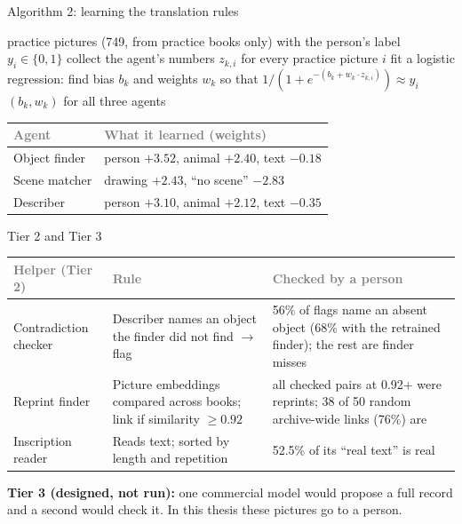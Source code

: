 \documentclass[aspectratio=169,11pt]{beamer}
\newcommand{\h}[1]{\textcolor{grey}{#1}}
\newcommand{\remark}[1]{\par\vspace{0.35cm}{\small\textcolor{grey}{#1}}}
\begin{document}
\begin{frame}{Algorithm 2: learning the translation rules}
\small
\begin{algorithmic}[1]
\Require practice pictures (749, from practice books only) with the person's label $y_i \in \{0, 1\}$
  \State collect the agent's numbers $z_{k,i}$ for every practice picture $i$
  \State fit a logistic regression: find bias $b_k$ and weights $w_k$ so that $1/(1+e^{-(b_k + w_k \cdot z_{k,i})}) \approx y_i$
\EndFor
\State \Return $(b_k, w_k)$ for all three agents
\end{algorithmic}
\vspace{0.4cm}
\begin{tabular}{@{}L{4.4cm} L{8.2cm}@{}}
\toprule
\h{Agent} & \h{What it learned (weights)}\\
\midrule
Object finder & person $+3.52$, animal $+2.40$, text $-0.18$\\
Scene matcher & drawing $+2.43$, ``no scene'' $-2.83$\\
Describer & person $+3.10$, animal $+2.12$, text $-0.35$\\
\bottomrule
\end{tabular}
\remark{Plus sign = pushes towards ``scene''. Nobody told it that a person is evidence of a scene; it learned it from the examples.}
\end{frame}

\begin{frame}{Tier 2 and Tier 3}
\small\begin{tabular}{@{}L{3.4cm} L{5.2cm} L{4.2cm}@{}}
\toprule
\h{Helper (Tier 2)} & \h{Rule} & \h{Checked by a person}\\
\midrule
Contradiction checker & Describer names an object the finder did not find $\to$ flag & 56\% of flags name an absent object (68\% with the retrained finder); the rest are finder misses\\
Reprint finder & Picture embeddings compared across books; link if similarity $\ge 0.92$ & all checked pairs at 0.92+ were reprints; 38 of 50 random archive-wide links (76\%) are\\
Inscription reader & Reads text; sorted by length and repetition & 52.5\% of its ``real text'' is real\\
\bottomrule
\end{tabular}
\vspace{0.4cm}

\textbf{Tier 3 (designed, not run):} one commercial model would propose a full record and a second would check it. In this thesis these pictures go to a person.
\end{frame}
\end{document}
